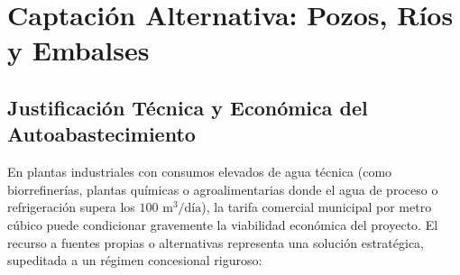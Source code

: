 \documentclass{report}
\begin{document}
\chapter{Captación Alternativa: Pozos, Ríos y Embalses}



\section{Justificación Técnica y Económica del Autoabastecimiento}

En plantas industriales con consumos elevados de agua técnica (como biorrefinerías, plantas químicas o agroalimentarias donde el agua de proceso o refrigeración supera los $100\text{ m}^3/\text{día}$), la tarifa comercial municipal por metro cúbico puede condicionar gravemente la viabilidad económica del proyecto. El recurso a fuentes propias o alternativas representa una solución estratégica, supeditada a un régimen concesional riguroso:
\end{document}
